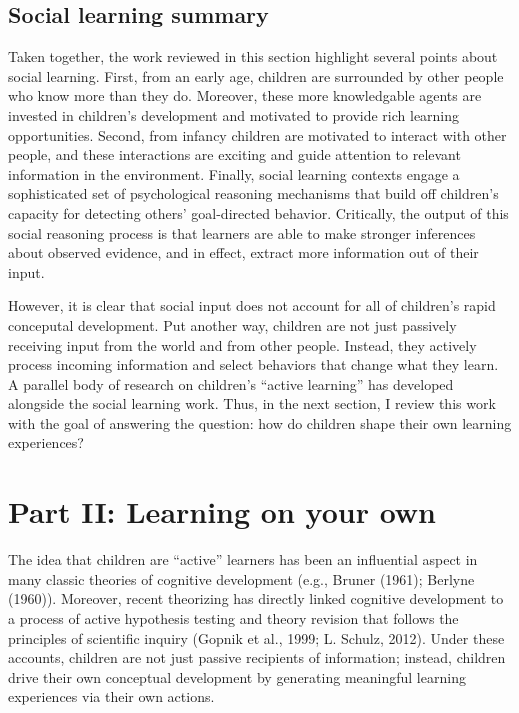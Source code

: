 \documentclass[english,floatsintext,man]{apa6}
\theoremstyle{definition}
\theoremstyle{definition}
\theoremstyle{definition}
\theoremstyle{remark}
\begin{document}
\subsection{Social learning summary}\label{social-learning-summary}

Taken together, the work reviewed in this section highlight several
points about social learning. First, from an early age, children are
surrounded by other people who know more than they do. Moreover, these
more knowledgable agents are invested in children's development and
motivated to provide rich learning opportunities. Second, from infancy
children are motivated to interact with other people, and these
interactions are exciting and guide attention to relevant information in
the environment. Finally, social learning contexts engage a
sophisticated set of psychological reasoning mechanisms that build off
children's capacity for detecting others' goal-directed behavior.
Critically, the output of this social reasoning process is that learners
are able to make stronger inferences about observed evidence, and in
effect, extract more information out of their input.

However, it is clear that social input does not account for all of
children's rapid conceputal development. Put another way, children are
not just passively receiving input from the world and from other people.
Instead, they actively process incoming information and select behaviors
that change what they learn. A parallel body of research on children's
\enquote{active learning} has developed alongside the social learning
work. Thus, in the next section, I review this work with the goal of
answering the question: how do children shape their own learning
experiences?

\section{Part II: Learning on your
own}\label{part-ii-learning-on-your-own}

The idea that children are \enquote{active} learners has been an
influential aspect in many classic theories of cognitive development
(e.g., Bruner (1961); Berlyne (1960)). Moreover, recent theorizing has
directly linked cognitive development to a process of active hypothesis
testing and theory revision that follows the principles of scientific
inquiry (Gopnik et al., 1999; L. Schulz, 2012). Under these accounts,
children are not just passive recipients of information; instead,
children drive their own conceptual development by generating meaningful
learning experiences via their own actions.
\end{document}

